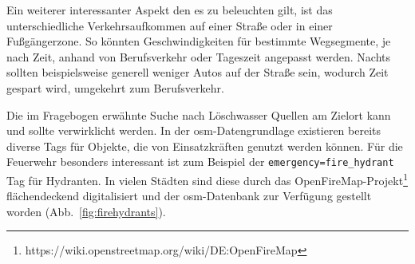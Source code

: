 Ein weiterer interessanter Aspekt den es zu beleuchten gilt, ist das unterschiedliche Verkehrsaufkommen auf einer Straße oder in einer Fußgängerzone.
So könnten Geschwindigkeiten für bestimmte Wegsegmente, je nach Zeit, anhand von Berufsverkehr oder Tageszeit angepasst werden.
Nachts sollten beispielsweise generell weniger Autos auf der Straße sein, wodurch Zeit gespart wird, umgekehrt zum Berufsverkehr.

Die im Fragebogen erwähnte Suche nach Löschwasser Quellen am Zielort kann und sollte verwirklicht werden.
In der \gls{osm}-Datengrundlage existieren bereits diverse Tags für Objekte, die von Einsatzkräften genutzt werden können.
Für die Feuerwehr besonders interessant ist zum Beispiel der \texttt{emergency=fire\_hydrant} Tag für Hydranten.
In vielen Städten sind diese durch das OpenFireMap-Projekt\footnote{https://wiki.openstreetmap.org/wiki/DE:OpenFireMap} flächendeckend digitalisiert und der \gls{osm}-Datenbank zur Verfügung gestellt worden (Abb.~\ref{fig:firehydrants}).